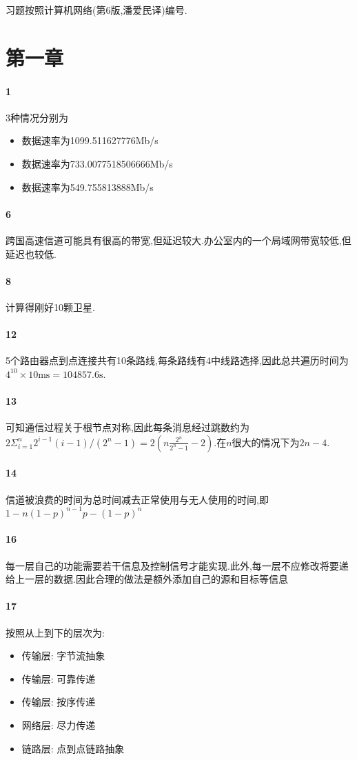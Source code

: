 \documentclass[a4paper]{article}
\begin{document}
\courseheader
{}
习题按照计算机网络(第6版,潘爱民译)编号.
\section{第一章}
\paragraph{1} 3种情况分别为
\begin{itemize}
    \item 数据速率为1099.511627776Mb/s
    \item 数据速率为733.0077518506666Mb/s
    \item 数据速率为549.755813888Mb/s
\end{itemize}
\paragraph{6}
跨国高速信道可能具有很高的带宽,但延迟较大.办公室内的一个局域网带宽较低,但延迟也较低.
\paragraph{8}
计算得刚好10颗卫星.
\paragraph{12}
5个路由器点到点连接共有10条路线,每条路线有4中线路选择,因此总共遍历时间为$4^{10}\times10\unit{\ms}=104857.6\unit{\s}$.
\paragraph{13}
可知通信过程关于根节点对称,因此每条消息经过跳数约为$2\Sigma_{i=1}^n2^{i-1}(i-1)/(2^n-1)=2(n\frac{2^n}{2^n-1}-2)$.在$n$很大的情况下为$2n-4$.
\paragraph{14}
信道被浪费的时间为总时间减去正常使用与无人使用的时间,即$1-n(1-p)^{n-1}p-(1-p)^n$
\paragraph{16}
每一层自己的功能需要若干信息及控制信号才能实现.此外,每一层不应修改将要递给上一层的数据.因此合理的做法是额外添加自己的源和目标等信息
\paragraph{17}按照从上到下的层次为:
\begin{itemize}
    \item 传输层: 字节流抽象
    \item 传输层: 可靠传递
    \item 传输层: 按序传递
    \item 网络层: 尽力传递
    \item 链路层: 点到点链路抽象
\end{itemize}
\end{document}
